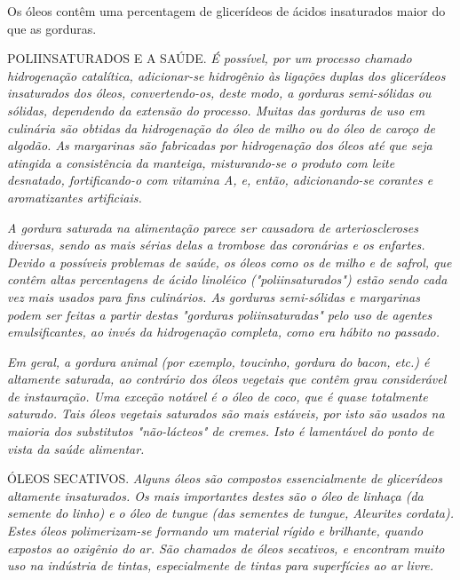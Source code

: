 \begin{tightcenter}



\end{tightcenter}

Os óleos contêm uma percentagem de glicerídeos de ácidos insaturados maior do que as gorduras.

\par\bigskip
\noindent POLIINSATURADOS E A SAÚDE. \emph{É possível, por um processo chamado hidrogenação catalítica, adicionar-se hidrogênio às ligações duplas dos glicerídeos insaturados dos óleos, convertendo-os, deste modo, a gorduras semi-sólidas ou sólidas, dependendo da extensão do processo. Muitas das gorduras de uso em culinária são obtidas da hidrogenação do óleo de milho ou do óleo de caroço de algodão. As margarinas são fabricadas por hidrogenação dos óleos até que seja atingida a consistência da manteiga, misturando-se o produto com leite desnatado, fortificando-o com vitamina A, e, então, adicionando-se corantes e aromatizantes artificiais.}

\emph{A gordura saturada na alimentação parece ser causadora de arterioscleroses diversas, sendo as mais sérias delas a trombose das coronárias e os enfartes. Devido a possíveis problemas de saúde, os óleos como os de milho e de safrol, que contêm altas percentagens de ácido linoléico ("poliinsaturados") estão sendo cada vez mais usados para fins culinários. As gorduras semi-sólidas e margarinas podem ser feitas a partir destas "gorduras poliinsaturadas" pelo uso de agentes emulsificantes, ao invés da hidrogenação completa, como era hábito no passado.}

\emph{Em geral, a gordura animal (por exemplo, toucinho, gordura do bacon, etc.) é altamente saturada, ao contrário dos óleos vegetais que contêm grau considerável de instauração. Uma exceção notável é o óleo de coco, que é quase totalmente saturado. Tais óleos vegetais saturados são mais estáveis, por isto são usados na maioria dos substitutos "não-lácteos" de cremes. Isto é lamentável do ponto de vista da saúde alimentar.}
\par\bigskip

\noindent ÓLEOS SECATIVOS. \emph{Alguns óleos são compostos essencialmente de glicerídeos altamente insaturados. Os mais importantes destes são o óleo de linhaça (da semente do linho) e o óleo de tungue (das sementes de tungue, Aleurites cordata). Estes óleos polimerizam-se formando um material rígido e brilhante, quando expostos ao oxigênio do ar. São chamados de óleos secativos, e encontram muito uso na indústria de tintas, especialmente de tintas para superfícies ao ar livre.}
\par\bigskip

